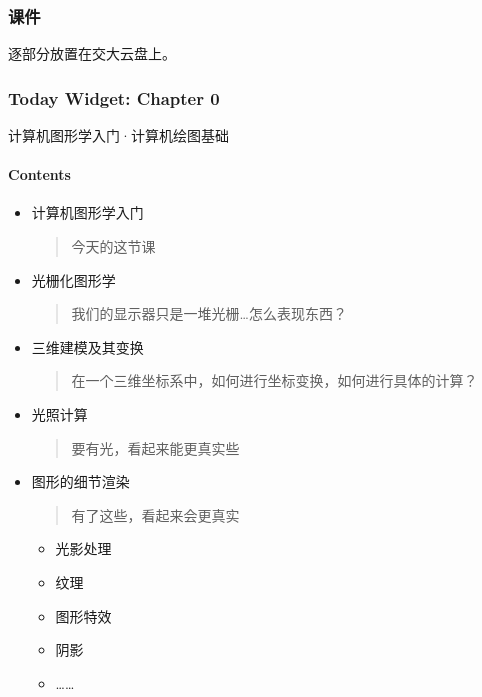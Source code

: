 \documentclass[
]{article}
\begin{document}
\hypertarget{header-n21}{%
\subsubsection{课件}\label{header-n21}}

逐部分放置在交大云盘上。

\hypertarget{header-n23}{%
\subsubsection{Today Widget: Chapter 0}\label{header-n23}}

计算机图形学入门·计算机绘图基础

\hypertarget{header-n25}{%
\paragraph{Contents}\label{header-n25}}

\begin{itemize}
\item
  计算机图形学入门

  \begin{quote}
  今天的这节课
  \end{quote}
\item
  光栅化图形学

  \begin{quote}
  我们的显示器只是一堆光栅\ldots 怎么表现东西？
  \end{quote}
\item
  三维建模及其变换

  \begin{quote}
  在一个三维坐标系中，如何进行坐标变换，如何进行具体的计算？
  \end{quote}
\item
  光照计算

  \begin{quote}
  要有光，看起来能更真实些
  \end{quote}
\item
  图形的细节渲染

  \begin{quote}
  有了这些，看起来会更真实
  \end{quote}

  \begin{itemize}
  \item
    光影处理
  \item
    纹理
  \item
    图形特效
  \item
    阴影
  \item
    \ldots\ldots{}
  \end{itemize}
\end{itemize}
\end{document}
